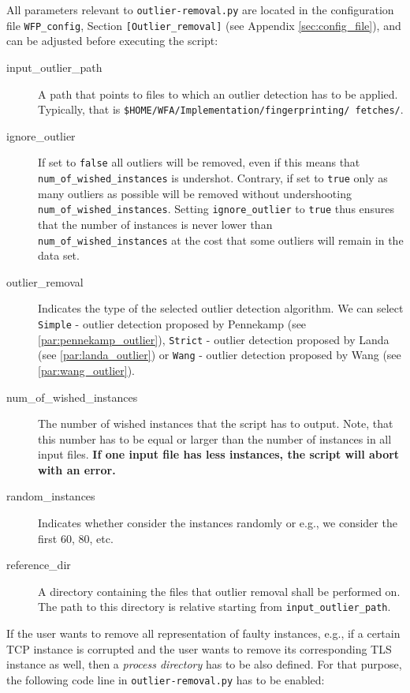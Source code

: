 All parameters relevant to \texttt{outlier-removal.py} are located in the configuration file \texttt{WFP\_config}, Section \texttt{[Outlier\_removal]} (see Appendix \ref{sec:config_file}), and can be adjusted before executing the script: 
\begin{description}
\item [input\_outlier\_path] A path that points to files to which an outlier detection has to be applied. Typically, that is \texttt{\$HOME/WFA/Implementation/fingerprinting/ fetches/}.
\item [ignore\_outlier] If set to \texttt{false} all outliers will be removed, even if this means that \texttt{num\_of\_wished\_instances} is undershot. Contrary, if set to \texttt{true} only as many outliers as possible will be removed without undershooting \texttt{num\_of\_wished\_instances}. Setting \texttt{ignore\_outlier} to \texttt{true} thus ensures that the number of instances is never lower than \texttt{num\_of\_wished\_instances} at the cost that some outliers will remain in the data set.
\item [outlier\_removal] Indicates the type of the selected outlier detection algorithm. We can select \texttt{Simple} - outlier detection proposed by Pennekamp (see \ref{par:pennekamp_outlier}), \texttt{Strict} - outlier detection proposed by Landa (see \ref{par:landa_outlier}) or \texttt{Wang} - outlier detection proposed by Wang (see \ref{par:wang_outlier}).
\item [num\_of\_wished\_instances] The number of wished instances that the script has to output. Note, that this number has to be equal or larger than the number of instances in all input files. \textbf{If one input file has less instances, the script will abort with an error.}
\item[random\_instances] Indicates whether consider the instances randomly or e.g., we consider the first 60, 80, etc.
\item [reference\_dir] A directory containing the files that outlier removal shall be performed on. The path to this directory is relative starting from \texttt{input\_outlier\_path}.
\end{description}
If the user wants to remove all representation of faulty instances, e.g., if a certain \ac{TCP} instance is corrupted and the user wants to remove its corresponding \ac{TLS} instance as well, then a \emph{process directory} has to be also defined. For that purpose, the following code line in \texttt{outlier-removal.py} has to be enabled:
